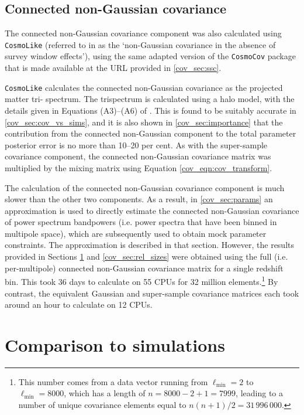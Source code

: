 \subsection{Connected non-Gaussian covariance}

The connected non-Gaussian covariance component was also calculated using \texttt{CosmoLike} (referred to in \citealt{Krause2017CosmoLike} as the `non-Gaussian covariance in the absence of survey window effects'), using the same adapted version of the \texttt{CosmoCov} package that is made available at the URL provided in \autoref{cov_sec:ssc}.

\texttt{CosmoLike} calculates the connected non-Gaussian covariance as the projected matter tri- spectrum. The trispectrum is calculated using a halo model, with the details given in Equations (A3)--(A6) of \citet{Krause2017CosmoLike} \citep[see also][]{Cooray2002, Takada2009}.
This is found to be suitably accurate in \autoref{cov_sec:cov_vs_sims}, and it is also shown in \autoref{cov_sec:importance} that the contribution from the connected non-Gaussian component to the total parameter posterior error is no more than 10--20 per cent.
As with the super-sample covariance component, the connected non-Gaussian covariance matrix was multiplied by the mixing matrix using Equation \eqref{cov_eqn:cov_transform}.

The calculation of the connected non-Gaussian covariance component is much slower than the other two components.
As a result, in \autoref{cov_sec:params} an approximation is used to directly estimate the connected non-Gaussian covariance of power spectrum bandpowers (i.e. power spectra that have been binned in multipole space), which are subsequently used to obtain mock parameter constraints. The approximation is described in that section.
However, the results provided in Sections \ref{cov_sec:sims} and \ref{cov_sec:rel_sizes} were obtained using the full (i.e. per-multipole) connected non-Gaussian covariance matrix for a single redshift bin. This took 36 days to calculate on 55 CPUs for 32 million elements.\footnote{This number comes from a data vector running from $\ell_\text{min} = 2$ to $\ell_\text{min} = 8000$, which has a length of $n = 8000 - 2 + 1 = 7999$, leading to a number of unique covariance elements equal to $n \left( n + 1 \right) / 2 = 31\,996\,000$.} By contrast, the equivalent Gaussian and super-sample covariance matrices each took around an hour to calculate on 12 CPUs.

\section{Comparison to simulations}
\label{cov_sec:sims}

